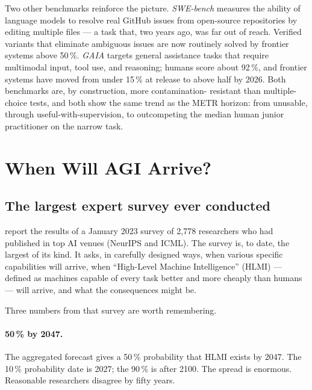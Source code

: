 \documentclass[11pt,a4paper]{article}
\begin{document}
Two other benchmarks reinforce the picture. \emph{SWE-bench}
\citep{jimenez2024swebench} measures the ability of language models to
resolve real GitHub issues from open-source repositories by editing
multiple files --- a task that, two years ago, was far out of reach.
Verified variants that eliminate ambiguous issues are now routinely
solved by frontier systems above 50\,\%. \emph{GAIA}
\citep{mialon2024gaia} targets general assistance tasks that require
multimodal input, tool use, and reasoning; humans score about 92\,\%,
and frontier systems have moved from under 15\,\% at release to above
half by 2026. Both benchmarks are, by construction, more contamination-
resistant than multiple-choice tests, and both show the same trend as
the METR horizon: from unusable, through useful-with-supervision, to
outcompeting the median human junior practitioner on the narrow
task.

\section{When Will AGI Arrive?}\label{sec:act4}

\subsection{The largest expert survey ever conducted}

\citet{grace2024thousands} report the results of a January 2023 survey
of 2,778 researchers who had published in top AI venues (NeurIPS and
ICML). The survey is, to date, the largest of its kind. It asks, in
carefully designed ways, when various specific capabilities will
arrive, when ``High-Level Machine Intelligence'' (HLMI) --- defined as
machines capable of every task better and more cheaply than humans ---
will arrive, and what the consequences might be.

Three numbers from that survey are worth remembering.

\paragraph{50\,\% by 2047.} The aggregated forecast gives a 50\,\%
probability that HLMI exists by 2047. The 10\,\% probability date is
2027; the 90\,\% is after 2100. The spread is enormous. Reasonable
researchers disagree by fifty years.
\end{document}
